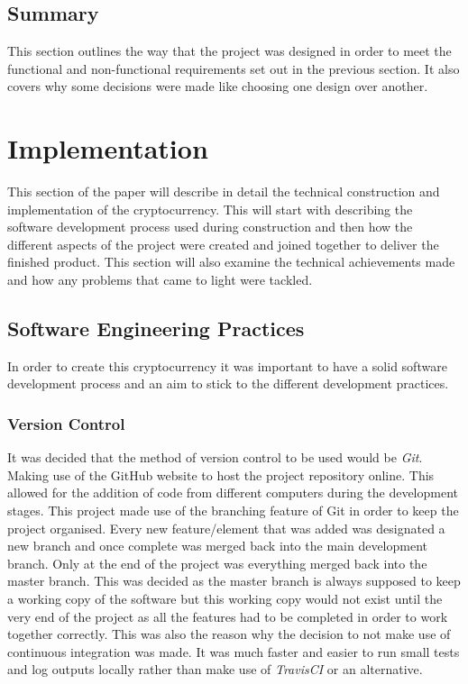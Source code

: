 \documentclass{l4proj}
\begin{document}
\section{Summary}
This section outlines the way that the project was designed in order to meet the functional and non-functional 
requirements set out in the previous section. It also covers why some decisions were made like choosing one design 
over another.

\chapter{Implementation}
This section of the paper will describe in detail the technical construction and implementation of the cryptocurrency.
This will start with describing the software development process used during construction and then how the different
aspects of the project were created and joined together to deliver the finished product. This section will also examine the 
technical achievements made and how any problems that came to light were tackled.


\section{Software Engineering Practices}
In order to create this cryptocurrency it was important to have a solid software development process and an
aim to stick to the different development practices.

\subsection{Version Control}
It was decided that the method of version control to be used would be \textit{Git}. Making use of the GitHub \citep{github} website to 
host the project repository online. This allowed for the addition of code from different computers during the
development stages. This project made use of the branching feature of Git in order to keep the project organised.
Every new feature/element that was added was designated a new branch and once complete was merged back into the
main development branch. Only at the end of the project was everything merged back into the master branch. This
was decided as the master branch is always supposed to keep a working copy of the software but this working copy
would not exist until the very end of the project as all the features had to be completed in order to work together
correctly. This was also the reason why the decision to not make use of continuous integration was made. It was
much faster and easier to run small tests and log outputs locally rather than make use of \textit{TravisCI} \citep{travis} or an 
alternative.
\end{document}
